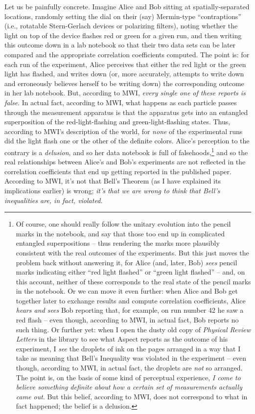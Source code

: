 \documentclass[12pt]{article}
\begin{document}
Let us be painfully concrete.  Imagine Alice and
Bob sitting at spatially-separated locations, randomly setting the
dial on their (say) Mermin-type ``contraptions'' (i.e., rotatable 
Stern-Gerlach devices or polarizing filters), 
noting whether the light on top of the 
device flashes red or green for a given run, and then writing this 
outcome down in a lab notebook so that their two data sets can be
later compared and the appropriate correlation coefficients computed.  
The point is:  for each run of the experiment, Alice perceives that
either the red light or the green light has flashed, and writes down
(or, more accurately, attempts to write down and erroneously believes 
herself to be writing down) the corresponding outcome in her lab notebook.  
But, according to MWI,
\emph{every single one of these reports is false}.  In actual fact,
according to MWI, what happens as each particle passes through the
measurement apparatus is that the apparatus gets into an entangled
superposition of the red-light-flashing and green-light-flashing
states.  Thus, according to MWI's description of the world, for 
\emph{none} of the experimental runs did the light flash
one or the other of the definite colors.  Alice's perception to the
contrary is a \emph{delusion}, and so her data notebook is full of
falsehoods,\footnote{Of course, one should really follow the unitary
  evolution into the pencil marks in the notebook, and say that those
  too end up in complicated entangled superpositions -- thus rendering
  the marks more plausibly consistent with the real outcomes of the
  experiments.  But this just moves the problem back without answering
  it, for Alice (and, later, Bob) \emph{sees} pencil marks
  indicating either ``red light flashed'' or ``green light flashed''
  -- and, on this account, neither of these corresponds to the real
  state of the pencil marks in the notebook.  Or we can  move it even
further:  when Alice and Bob get together later to exchange results
and compute correlation coefficients, Alice \emph{hears and sees} Bob
reporting that, for example, on run number 42 he saw a red
flash -- even though, according to MWI, in actual fact, Bob reports no
such thing.  Or further yet:  when I open the dusty old copy of
\emph{Physical Review Letters} in the library to see what Aspect
reports as the outcome of his experiment, I \emph{see} the droplets 
of ink on the pages arranged in a way that I take as meaning that
Bell's Inequality was violated in the experiment -- even though,
according to MWI, in actual fact, the droplets are \emph{not} so
arranged.  The point is, on the basis of some kind of perceptual
experience, \emph{I come to believe something 
definite about how a certain set of measurements actually came out}.
But this belief, according to MWI, does not correspond to  what in
fact happened; the belief is a delusion.}
and so the real relationships between Alice's and Bob's experiments
are not reflected in the 
correlation coefficients that end up getting
reported in the published paper.  According to MWI,
it's not that Bell's Theorem (as I have explained its implications 
earlier) is wrong; \emph{it's that we are wrong to think that Bell's
inequalities are, in fact, violated.} \cite{albert}
\end{document}
